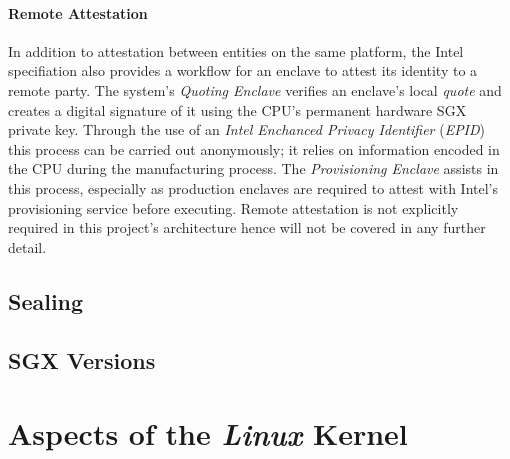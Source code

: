 \paragraph{Remote Attestation} In addition to attestation between entities on the same platform, the Intel specifiation also provides a workflow for an enclave to attest its identity to a remote party. The system's \textit{Quoting Enclave} verifies an enclave's local \textit{quote} and creates a digital signature of it using the CPU's permanent hardware SGX private key. Through the use of an \textit{Intel Enchanced Privacy Identifier} (\textit{EPID}) this process can be carried out anonymously; it relies on information encoded in the CPU during the manufacturing process. The \textit{Provisioning Enclave} assists in this process, especially as production enclaves are required to attest with Intel's provisioning service before executing. Remote attestation is not explicitly required in this project's architecture hence will not be covered in any further detail.

\subsection{Sealing}
\label{sec:sealing}

\subsection{SGX Versions}
\label{sec:sgx-versions}





\section{Aspects of the \textit{Linux} Kernel}